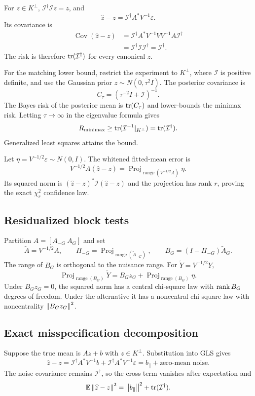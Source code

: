 For $z\in K^\perp$, $\mathcal I^\dagger\mathcal I z=z$, and
\[
\widehat z-z
=\mathcal I^\dagger A^\ast V^{-1}\varepsilon.
\]
Its covariance is
\begin{align*}
\operatorname{Cov}(\widehat z-z)
&=\mathcal I^\dagger A^\ast V^{-1}VV^{-1}A\mathcal I^\dagger\\
&=\mathcal I^\dagger\mathcal I\mathcal I^\dagger
=\mathcal I^\dagger.
\end{align*}
The risk is therefore $\operatorname{tr}(\mathcal I^\dagger)$ for every canonical $z$.

For the matching lower bound, restrict the experiment to $K^\perp$, where
$\mathcal I$ is positive definite, and use the Gaussian prior
$z\sim N(0,\tau^2I)$.  The posterior covariance is
\[
C_\tau=(\tau^{-2}I+\mathcal I)^{-1}.
\]
The Bayes risk of the posterior mean is $\operatorname{tr}(C_\tau)$ and lower-bounds the
minimax risk.  Letting $\tau\to\infty$ in the eigenvalue formula gives
\[
R_{\rm minimax}\ge\operatorname{tr}(\mathcal I^{-1}|_{K^\perp})
=\operatorname{tr}(\mathcal I^\dagger).
\]
Generalized least squares attains the bound.

Let $\eta=V^{-1/2}\varepsilon\sim N(0,I)$.  The whitened fitted-mean error is
\[
V^{-1/2}A(\widehat z-z)
=\operatorname{Proj}_{\operatorname{range}(V^{-1/2}A)}\eta.
\]
Its squared norm is
$(\widehat z-z)^\ast\mathcal I(\widehat z-z)$ and the projection has rank
$r$, proving the exact $\chi_r^2$ confidence law.

\subsection{Residualized block tests}

Partition $A=[A_{-G}\ A_G]$ and set
\[
\widetilde A=V^{-1/2}A,
\qquad
\Pi_{-G}=\operatorname{Proj}_{\operatorname{range}(\widetilde A_{-G})},
\qquad
B_G=(I-\Pi_{-G})\widetilde A_G.
\]
The range of $B_G$ is orthogonal to the nuisance range.  For
$\widetilde Y=V^{-1/2}Y$,
\[
\operatorname{Proj}_{\operatorname{range}(B_G)}\widetilde Y
=B_Gz_G+
\operatorname{Proj}_{\operatorname{range}(B_G)}\eta.
\]
Under $B_Gz_G=0$, the squared norm has a central chi-square law with
$\operatorname{rank} B_G$ degrees of freedom.  Under the alternative it has a noncentral
chi-square law with noncentrality $\left\lVert B_Gz_G\right\rVert^2$.

\subsection{Exact misspecification decomposition}

Suppose the true mean is $Az+b$ with $z\in K^\perp$.  Substitution into GLS
gives
\[
\widehat z-z
=\mathcal I^\dagger A^\ast V^{-1}b
+\mathcal I^\dagger A^\ast V^{-1}\varepsilon
=b_\parallel+\text{zero-mean noise}.
\]
The noise covariance remains $\mathcal I^\dagger$, so the cross term vanishes
after expectation and
\[
\mathbb E\left\lVert \widehat z-z\right\rVert^2
=\left\lVert b_\parallel\right\rVert^2+\operatorname{tr}(\mathcal I^\dagger).
\]

